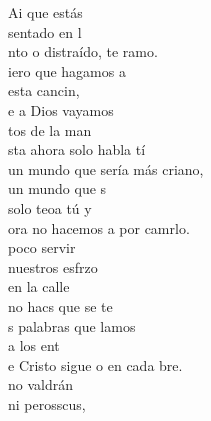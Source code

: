 \documentclass[12pt]{article}
\begin{document}
 
    \sffamily

    \portada[titulo=Cantoral, subtitulo=Grupo San Francisco]
    \newpage
    \tableofcontents
    \newpage


    \begin{multicols*}{2}
    
\begin{cancion}%
	Ai que estás \\
	sentado en l     \\
	nto o distraído, te ramo.\\
	iero que hagamos a \\
	esta cancin,\\
	e a Dios vayamos \\
	tos de la man\\
	sta ahora solo habla tí\\
	un mundo que sería más criano,\\
	 un mundo que s  \\
	solo teoa tú y \\
	ora no hacemos a por camrlo.\\
	 poco servir \\
	nuestros esfrzo\\
	en la calle \\
	no hacs que se te\\
	s palabras que lamos \\
	a los ent\\
	e Cristo sigue o en cada bre.\\
	 no valdrán \\
	ni perosscus, \\

\end{cancion}
\end{multicols*}
\end{document}

